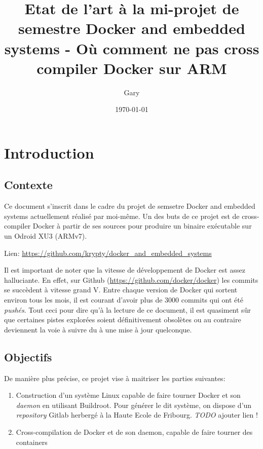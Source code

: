 \documentclass[11pt,a4paper,oneside]{article}
\title{Etat de l'art à la mi-projet de semestre Docker and embedded systems - Où comment ne pas cross compiler Docker sur ARM}
\date{\today}
\author{Gary \bsc{Marigliano}}
\begin{document}
\maketitle
{}
\newpage
\tableofcontents
\newpage
{}

\chapter{Introduction}

\section{Contexte}

Ce document s'inscrit dans le cadre du projet de semsetre Docker and embedded systems actuellement réalisé par moi-même. Un des buts de ce projet est de cross-compiler Docker à partir de ses sources pour produire un binaire exécutable sur un Odroid XU3 (ARMv7).

Lien: \url{https://github.com/krypty/docker_and_embedded_systems}

Il est important de noter que la vitesse de développement de Docker est assez halluciante. En effet, sur Github (\url{https://github.com/docker/docker}) les commits se succèdent à vitesse grand V. Entre chaque version de Docker qui sortent environ tous les mois, il est courant d'avoir plus de 3000 commits qui ont été \emph{pushés}. Tout ceci pour dire qu'à la lecture de ce document, il est quasiment sûr que certaines pistes explorées soient définitivement obsolètes ou au contraire deviennent la voie à suivre du à une mise à jour quelconque.



\section{Objectifs}

De manière plus précise, ce projet vise à maitriser les parties suivantes:

\begin{enumerate}
  \item Construction d'un système Linux capable de faire tourner Docker et son \emph{daemon} en utilisant Buildroot. Pour générer le dit système, on dispose d'un \emph{repository} Gitlab herbergé à la Haute Ecole de Fribourg. \emph{TODO} ajouter lien !

  \item Cross-compilation de Docker et de son daemon, capable de faire tourner des containers
\end{enumerate}
\end{document}
